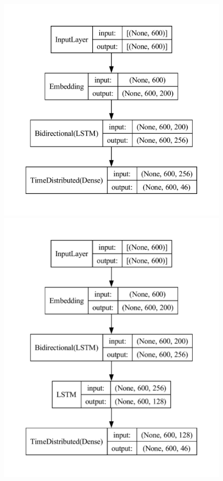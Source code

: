 \documentclass[11pt]{article}
\begin{document}
\begin{figure}
    \begin{minipage}{.3\textwidth}
      \includegraphics[width=\linewidth]{baseline_model.pdf}
    \end{minipage} \quad
    \begin{minipage}{.3\textwidth}
      \includegraphics[width=\linewidth]{model_1.pdf}

\end{minipage}
\end{figure}
\end{document}
